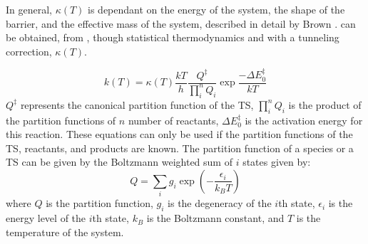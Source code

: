 \documentclass[preprint, 11pt]{elsarticle} %
\begin{document}
In general, $\kappa(T)$ is dependant on the energy of the system, the shape of the barrier, and the effective mass of the system, described in detail by Brown \cite{Brown:1981}.
 can be obtained, from , though statistical thermodynamics and with a tunneling correction, $\kappa(T)$. 

\begin{equation}
    k(T) = \kappa(T) \frac{k T}{h} \frac{Q^\ddagger}{\prod^{n}_{i} Q_i} \exp{\frac{-\Delta E^{\ddagger}_{0}}{k T}}
    \label{eyring:2}
\end{equation}
$Q^\ddagger$ represents the canonical partition function of the TS, $\prod^n_i Q_i$ is the product of the partition functions of $n$ number of reactants, $\Delta E^{\ddagger}_0$ is the activation energy for this reaction.
These equations can only be used if the partition functions of the TS, reactants, and products are known. 
The partition function of a species or a TS can be given by the Boltzmann weighted sum of $i$ states given by:
\begin{equation}
    Q = \sum_i g_i \exp\left(-\frac{\epsilon_i}{k_B T}\right)
    \label{eq:Q}
\end{equation}
where $Q$ is the partition function, $g_i$ is the degeneracy of the $i$th state, $\epsilon_i$ is the energy level of the $i$th state, $k_B$ is the Boltzmann constant, and $T$ is the temperature of the system.
\end{document}
